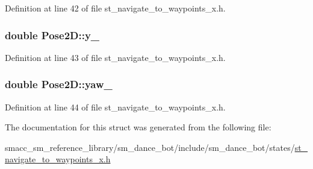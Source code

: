 Definition at line 42 of file st\+\_\+navigate\+\_\+to\+\_\+waypoints\+\_\+x.\+h.

\subsubsection[{\texorpdfstring{y\+\_\+}{y_}}]{\setlength{\rightskip}{0pt plus 5cm}double Pose2\+D\+::y\+\_\+}\hypertarget{structPose2D_a2c31f84b294702b4a82a2c9f44451d54}{}\label{structPose2D_a2c31f84b294702b4a82a2c9f44451d54}


Definition at line 43 of file st\+\_\+navigate\+\_\+to\+\_\+waypoints\+\_\+x.\+h.

\subsubsection[{\texorpdfstring{yaw\+\_\+}{yaw_}}]{\setlength{\rightskip}{0pt plus 5cm}double Pose2\+D\+::yaw\+\_\+}\hypertarget{structPose2D_a3f0f263a49f611369bcfb06ca9cd5a4d}{}\label{structPose2D_a3f0f263a49f611369bcfb06ca9cd5a4d}


Definition at line 44 of file st\+\_\+navigate\+\_\+to\+\_\+waypoints\+\_\+x.\+h.



The documentation for this struct was generated from the following file\+:\begin{DoxyCompactItemize}
\item 
smacc\+\_\+sm\+\_\+reference\+\_\+library/sm\+\_\+dance\+\_\+bot/include/sm\+\_\+dance\+\_\+bot/states/\hyperlink{st__navigate__to__waypoints__x_8h}{st\+\_\+navigate\+\_\+to\+\_\+waypoints\+\_\+x.\+h}\end{DoxyCompactItemize}

